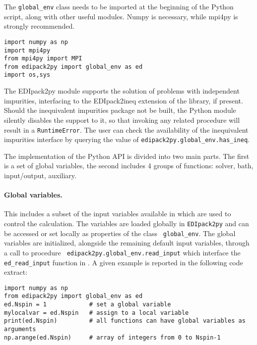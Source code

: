 \documentclass[edipack_sp.tex]{subfiles}
\begin{document}
The {\tt global\_env} class needs to be imported at the beginning
of the Python script, along with other useful modules. Numpy is
necessary, while mpi4py is strongly recommended.

\begin{lstlisting}[style=mypython]
import numpy as np
import mpi4py
from mpi4py import MPI
from edipack2py import global_env as ed
import os,sys
\end{lstlisting}

The EDIpack2py module supports the solution of problems with independent
impurities, interfacing to the EDIpack2ineq extension of the
library, if present. Should the inequivalent impurities package not be
built, the Python module silently disables the support to it, so that
invoking any related procedure  will result in a {\tt RuntimeError}.
The user can check the availability of the inequivalent impurities
interface by querying the value of  {\tt edipack2py.global\_env.has\_ineq}.

The implementation of the Python API is divided into two main parts. The
first is a set of global variables, the second includes 4 groups of
functions: solver, bath, input/output, auxiliary. 

\paragraph{{\bf Global variables}.}
This includes a subset of the input variables available in \NAME which
are used to control the calculation.
The variables are loaded globally in {\tt EDIpack2py} and can be accessed
or set locally as properties of the class {\tt
  global\_env}. The global variables are initialized, alongside the remaining
default input variables, through a call to procedure {\tt
  edipack2py.global\_env.read\_input} which interface the {\tt
  ed\_read\_input} function in \NAME. 
A given example is reported in the following code extract:

\begin{lstlisting}[style=mypython]
import numpy as np
from edipack2py import global_env as ed
ed.Nspin = 1            # set a global variable
mylocalvar = ed.Nspin   # assign to a local variable
print(ed.Nspin)         # all functions can have global variables as arguments
np.arange(ed.Nspin)     # array of integers from 0 to Nspin-1
\end{lstlisting}
\end{document}
